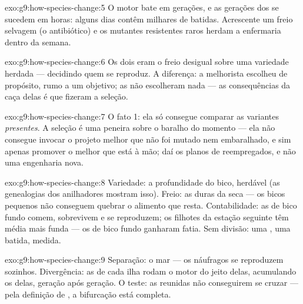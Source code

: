 \begin{solution}{exo:g9:how-species-change:5}
O motor bate em gerações, e as gerações dos  se
sucedem em horas: alguns dias contêm milhares de batidas.
Acrescente um freio selvagem (o antibiótico) e os mutantes
resistentes raros herdam a enfermaria dentro da semana.
\end{solution}

\begin{solution}{exo:g9:how-species-change:6}
Os dois eram o freio desigual sobre uma variedade herdada ---
decidindo quem se reproduz. A diferença: a melhorista
escolheu de propósito, rumo a um objetivo; as  não
escolheram nada --- as consequências da caça delas é que
fizeram a seleção.
\end{solution}

\begin{solution}{exo:g9:how-species-change:7}
O fato 1: ela só consegue comparar as variantes
\emph{presentes}. A seleção é uma peneira sobre o baralho do
momento --- ela não consegue invocar o projeto melhor que não
foi mutado nem embaralhado, e sim apenas promover o melhor
que está à mão; daí os planos de  reempregados, e não
uma engenharia nova.
\end{solution}

\begin{solution}{exo:g9:how-species-change:8}
Variedade: a profundidade do bico, herdável (as genealogias
dos anilhadores mostram isso). Freio: as  duras da
seca --- os bicos pequenos não conseguem quebrar o alimento
que resta. Contabilidade: as  de bico fundo comem,
sobrevivem e se reproduzem; os filhotes da estação seguinte
têm média mais funda --- os  de bico fundo ganharam
fatia. Sem divisão: uma , uma batida, medida.
\end{solution}

\begin{solution}{exo:g9:how-species-change:9}
Separação: o mar --- os náufragos se reproduzem sozinhos.
Divergência: as  de cada ilha rodam o motor do jeito
delas, acumulando os  delas, geração após geração. O
teste: as  reunidas não conseguirem se cruzar --- pela
definição de , a bifurcação está completa.
\end{solution}


